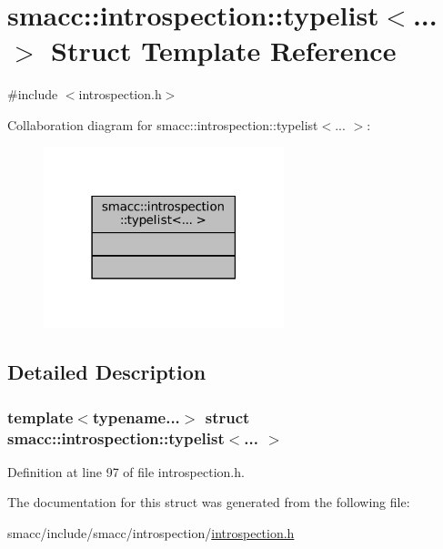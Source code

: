 \hypertarget{structsmacc_1_1introspection_1_1typelist}{}\section{smacc\+:\+:introspection\+:\+:typelist$<$... $>$ Struct Template Reference}
\label{structsmacc_1_1introspection_1_1typelist}


{\ttfamily \#include $<$introspection.\+h$>$}



Collaboration diagram for smacc\+:\+:introspection\+:\+:typelist$<$... $>$\+:
\nopagebreak
\begin{figure}[H]
\begin{center}
\leavevmode
\includegraphics[width=198pt]{structsmacc_1_1introspection_1_1typelist__coll__graph}
\end{center}
\end{figure}


\subsection{Detailed Description}
\subsubsection*{template$<$typename...$>$\newline
struct smacc\+::introspection\+::typelist$<$... $>$}



Definition at line 97 of file introspection.\+h.



The documentation for this struct was generated from the following file\+:\begin{DoxyCompactItemize}
\item 
smacc/include/smacc/introspection/\hyperlink{introspection_8h}{introspection.\+h}\end{DoxyCompactItemize}
